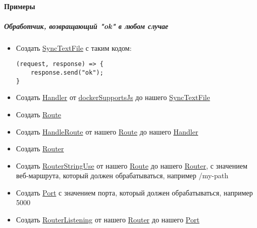 \documentclass{article}
\begin{document}
\paragraph{Примеры}
\subparagraph{Обработчик, возвращающий "ok" в любом случае}
\begin{itemize}
  \item Создать \hyperlink{Core.SyncTextFile.Description}{SyncTextFile} с таким кодом:
        \begin{lstlisting}
(request, response) => {
    response.send("ok");
}
\end{lstlisting}
  \item Создать \hyperlink{Core.Handler.Description}{Handler} от
        \hyperlink{Core.dockerSupportsJs.Description}{dockerSupportsJs}
        до нашего \hyperlink{Core.SyncTextFile.Description}{SyncTextFile}
  \item Создать \hyperlink{Core.Route.Description}{Route}
  \item Создать \hyperlink{Core.HandleRoute.Description}{HandleRoute} от нашего
        \hyperlink{Core.Route.Description}{Route} до нашего \hyperlink{Core.Handler.Description}{Handler}
  \item Создать \hyperlink{Core.Router.Description}{Router}
  \item Создать \hyperlink{Core.RouterStringUse.Description}{RouterStringUse} от нашего
        \hyperlink{Core.Route.Description}{Route} до нашего \hyperlink{Core.Router.Description}{Router},
        с
        значением
        веб-маршрута, который должен обрабатываться, например /my-path
  \item Создать \hyperlink{Core.Port.Description}{Port} с значением порта, который должен
        обрабатываться, например
        5000
  \item Создать \hyperlink{Core.RouterListening.Description}{RouterListening} от нашего
        \hyperlink{Core.Router.Description}{Router} до нашего \hyperlink{Core.Port.Description}{Port}
\end{itemize}
\end{document}
